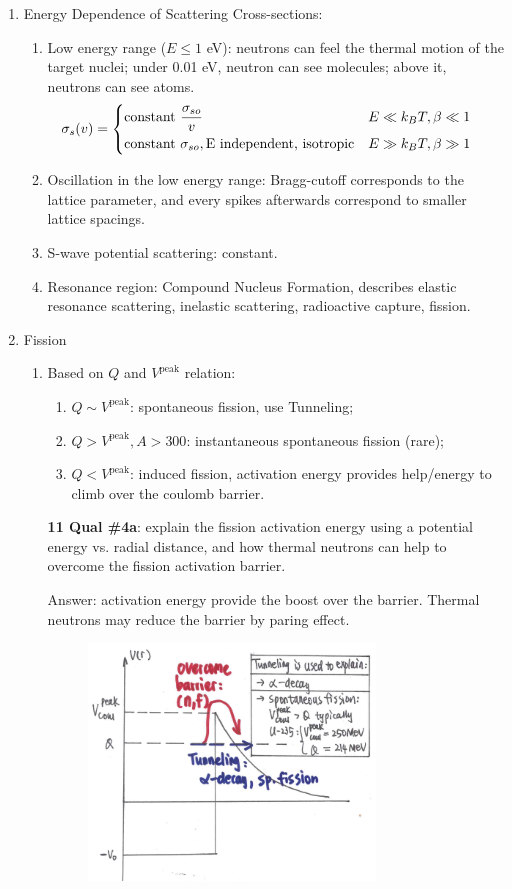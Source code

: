 \documentclass{school-22.101-notes}
\begin{document}
\begin{enumerate}
\item Energy Dependence of Scattering Cross-sections:
\begin{enumerate}
\item Low energy range ($E \le 1$ eV): neutrons can feel the thermal motion of the target nuclei; under 0.01 eV, neutron can see molecules; above it, neutrons can see atoms.
    \begin{align}
    \sigma_s (v) &= 
    \begin{dcases*}
    \mbox{constant } \frac{\sigma_{so}}{v}& $E \ll k_B T, \beta \ll 1$ \\
    \mbox{constant } \sigma_{so}, \mbox{E independent, isotropic} & $E \gg k_B T, \beta \gg 1$ 
    \end{dcases*} 
    \end{align}
\item Oscillation in the low energy range: Bragg-cutoff corresponds to the lattice parameter, and every spikes afterwards correspond to smaller lattice spacings. 
\item S-wave potential scattering: constant.
\item Resonance region: Compound Nucleus Formation, describes elastic resonance scattering, inelastic scattering, radioactive capture, fission. 
\end{enumerate}

\item Fission
\begin{enumerate}
\item Based on $Q$ and $V^{\mathrm{peak}}$ relation:
    \begin{enumerate}
    \item $Q \sim V^{\mathrm{peak}}$: spontaneous fission, use Tunneling; 
    \item $Q > V^{\mathrm{peak}}, A>300$: instantaneous spontaneous fission (rare);
    \item $Q < V^{\mathrm{peak}}$: induced fission, activation energy provides help/energy to climb over the coulomb barrier. 
    \end{enumerate}
\textbf{11 Qual \#4a}: explain the fission activation energy using a potential energy vs. radial distance, and how thermal neutrons can help to overcome the fission activation barrier. 

Answer: activation energy provide the boost over the barrier. Thermal neutrons may reduce the barrier by paring effect. 
    \begin{figure}[ht]
       \centering
       \includegraphics[width=3in]{images/ni/fission-mechanism.png}
    \end{figure}


\end{enumerate}
\end{enumerate}
\end{document}

